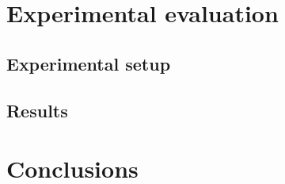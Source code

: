 \section{Experimental evaluation}\label{Results}
\subsection{Experimental setup}
\subsection{Results}

\section{Conclusions}
